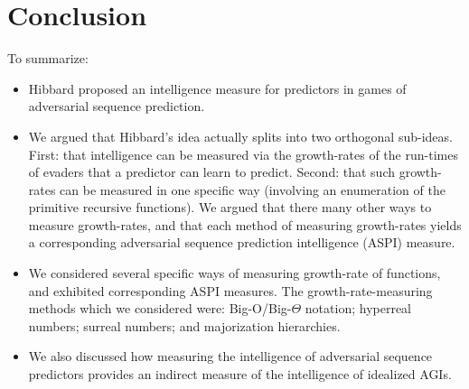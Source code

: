\documentclass{article}
\begin{document}
\section{Conclusion}
\label{conclusionsection}

To summarize:
\begin{itemize}
    \item
    Hibbard proposed \cite{hibbard} an intelligence measure for predictors
    in games of adversarial sequence prediction.
    \item
    We argued that Hibbard's idea actually splits into two orthogonal sub-ideas.
    First: that intelligence can be measured via the growth-rates of the run-times
    of evaders that a predictor can learn to predict. Second: that such growth-rates can
    be measured in one specific way (involving an enumeration of the primitive recursive
    functions). We argued that there many other ways to measure growth-rates,
    and that each method of measuring growth-rates yields a corresponding
    adversarial sequence prediction intelligence (ASPI) measure.
    \item
    We considered several specific ways of measuring growth-rate of functions, and exhibited
    corresponding ASPI measures. The growth-rate-measuring methods
    which we considered were: Big-O/Big-$\Theta$ notation; hyperreal numbers;
    surreal numbers; and majorization hierarchies.
    \item
    We also discussed how measuring the intelligence of adversarial sequence predictors
    provides an indirect measure of the intelligence of idealized AGIs.
\end{itemize}




\end{document}
